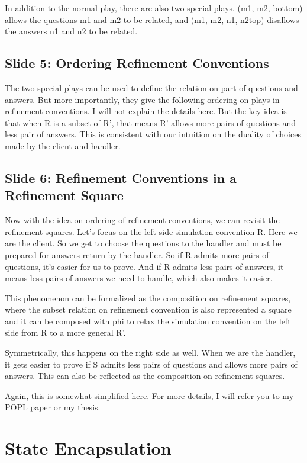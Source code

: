 \documentclass{article}
\begin{document}
In addition to the normal play, there are also two special plays. (m1, m2,
bottom) allows the questions m1 and m2 to be related, and (m1, m2, n1, n2top)
disallows the answers n1 and n2 to be related.

\subsection{Slide 5: Ordering Refinement Conventions}

The two special plays can be used to define the relation on part of questions
and answers. But more importantly, they give the following ordering on plays in
refinement conventions. I will not explain the details here. But the key idea is
that when R is a subset of R', that means R' allows more pairs of questions and
less pair of answers. This is consistent with our intuition on the duality of
choices made by the client and handler.

\subsection{Slide 6: Refinement Conventions in a Refinement Square}

Now with the idea on ordering of refinement conventions, we can revisit the
refinement squares. Let's focus on the left side simulation convention R. Here
we are the client. So we get to choose the questions to the handler and must be
prepared for answers return by the handler. So if R admits more pairs of
questions, it's easier for us to prove. And if R admits less pairs of answers,
it means less pairs of answers we need to handle, which also makes it easier.

This phenomenon can be formalized as the composition on refinement squares,
where the subset relation on refinement convention is also represented a square
and it can be composed with phi to relax the simulation convention on the left
side from R to a more general R'.

Symmetrically, this happens on the right side as well. When we are the handler,
it gets easier to prove if S admits less pairs of questions and allows more
pairs of answers. This can also be reflected as the composition on refinement
squares.

Again, this is somewhat simplified here. For more details, I will refer you to
my POPL paper or my thesis.

\section{State Encapsulation}
\end{document}

